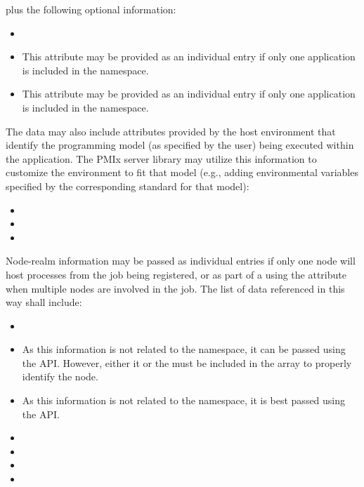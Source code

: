 plus the following optional information:

\begin{itemize}
    \item {}
    \item {}This attribute may be provided as an individual  entry if only one application is included in the namespace.
    \pasteAttributeItemEnd
    \item {}This attribute may be provided as an individual  entry if only one application is included in the namespace.
    \pasteAttributeItemEnd
\end{itemize}

The data may also include attributes provided by the host environment that identify the programming model (as specified by the user) being executed within the application. The \ac{PMIx} server library may utilize this information to customize the environment to fit that model (e.g., adding environmental variables specified by the corresponding standard for that model):

\begin{itemize}
    \item {}
    \item {}
    \item {}
\end{itemize}


Node-realm information may be passed as individual  entries if only one node will host processes from the job being registered, or as part of a  using the  attribute when multiple nodes are involved in the job. The list of data referenced in this way shall include:

\begin{itemize}
    \item {}
    \item {}As this information is not related to the namespace, it can be passed using the  \ac{API}. However, either it or the  must be included in the array to properly identify the node.
    \pasteAttributeItemEnd
    \item {}As this information is not related to the namespace, it is best passed using the  \ac{API}.
    \pasteAttributeItemEnd
    \item {}
    \item {}
    \item {}
    \item {}
\end{itemize}

